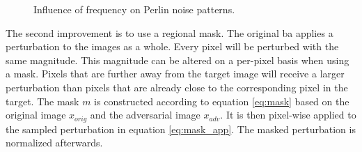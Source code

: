 \begin{figure}
	\centering
	\quad
	\quad
	\caption[Influence of frequency on Perlin noise]{Influence of frequency on Perlin noise patterns.}
	\label{fig:perlin_noise_frequencies}
\end{figure}

The second improvement is to use a regional mask. The original \gls{ba} applies a perturbation to the images as a whole. Every pixel will be perturbed with the same magnitude. This magnitude can be altered on a per-pixel basis when using a mask. Pixels that are further away from the target image will receive a larger perturbation than pixels that are already close to the corresponding pixel in the target. The mask $m$ is constructed according to equation \ref{eq:mask} based on the original image $x_{orig}$ and the adversarial image $x_{adv}$. It is then pixel-wise applied to the sampled perturbation in equation \ref{eq:mask_app}. The masked perturbation is normalized afterwards.\\ 

